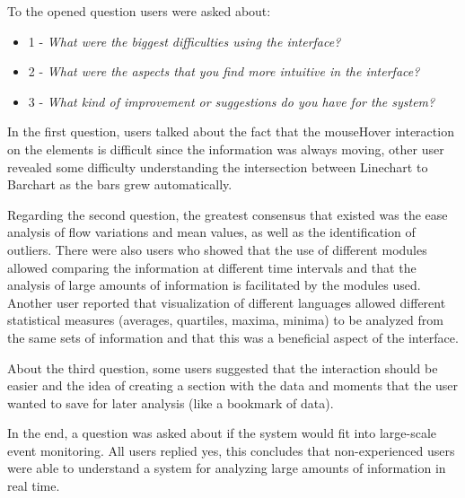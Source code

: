 \documentclass[letterpaper, 10 pt, conference]{ieeeconf}  %
\begin{document}
To the opened question users were asked about: 
\begin{itemize}
    \item 1 - \textit{What were the biggest difficulties using the interface?} 
    \item 2 - \textit{What were the aspects that you find more intuitive in the interface?}
    \item 3 - \textit{What kind of improvement or suggestions do you have for the system?}
\end{itemize}

In the first question, users talked about the fact that the mouseHover interaction on the elements is difficult since the information was always moving, other user revealed some difficulty understanding the intersection between Linechart to Barchart as the bars grew automatically.

Regarding the second question, the greatest consensus that existed was the ease analysis of flow variations and mean values, as well as the identification of outliers. There were also users who showed that the use of different modules allowed comparing the information at different time intervals and that the analysis of large amounts of information is facilitated by the modules used. Another user reported that visualization of different languages allowed different statistical measures (averages, quartiles, maxima, minima) to be analyzed from the same sets of information and that this was a beneficial aspect of the interface.

About the third question, some users suggested that the interaction should be easier and the idea of creating a section with the data and moments that the user wanted to save for later analysis (like a bookmark of data).

In the end, a question was asked about if the system would fit into large-scale event monitoring. All users replied yes, this concludes that non-experienced users were able to understand a system for analyzing large amounts of information in real time.
\end{document}
